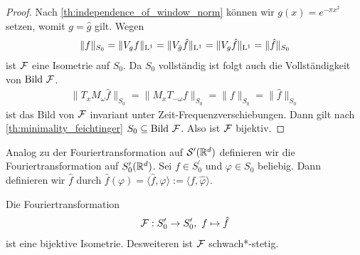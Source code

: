 \begin{proof}
		
		Nach \ref{th:independence_of_window_norm} können wir $ g(x) = e^{-\pi x^2} $ setzen, womit $ g = \hat{g} $ gilt.
		Wegen 
		\begin{align*}
		\| f \|_{S_0} 
		=
		\| V_g f \|_{\mathrm{L}^1} 
		=
		\|V_{\hat{g}} \hat{f} \|_{\mathrm{L}^1}
		=
		\| V_{g} \hat{f} \|_{\mathrm{L}^1}
		=
		\| \hat{f} \|_{S_0}
		\end{align*}
		ist $ \mathcal{F} $ eine Isometrie auf $ S_0 $. Da $ S_0 $ vollständig ist folgt auch die Vollständigkeit von $ \mathrm{Bild} \ \mathcal{F} $.
		\begin{align*}
		\| T_x M_\omega \hat{f} \|_{S_0}
		=
		\|  M_x T_{- \omega} f \|_{S_0}
		= 
		\| f \|_{S_0} =  \| \hat{f } \|_{S_0}
		\end{align*}
		ist das Bild von $ \mathcal{F} $ invariant unter Zeit-Frequenzverschiebungen.
		Dann gilt nach \ref{th:minimality_feichtinger} $ S_0 \subseteq \mathrm{Bild} \ \mathcal{F} $.
		Also ist  $ \mathcal{F} $ bijektiv.
\end{proof}

Analog zu der Fouriertransformation auf $ \mathcal{S}^\prime(\mathbb{R}^d)  $ definieren wir die Fouriertransformation auf $ S_0^\prime(\mathbb{R}^d) $.
Sei $ f \in S_0^\prime $ und $ \varphi \in S_0 $ beliebig. Dann definieren wir $ \hat{f} $ durch $  \hat{f} (\varphi) = \langle  \hat{f}, \varphi \rangle := \langle f , \hat{\varphi} \rangle $.


\begin{sz}\label{th:fourier_feicht_dual}
	Die Fouriertransformation
	\begin{align}
	\mathcal{F} : S_0^\prime \to S_0^\prime, \  f \mapsto \hat{f}
	\end{align}
	ist eine bijektive Isometrie.
	Desweiteren ist $ \mathcal{F} $  schwach*-stetig.
\end{sz}

